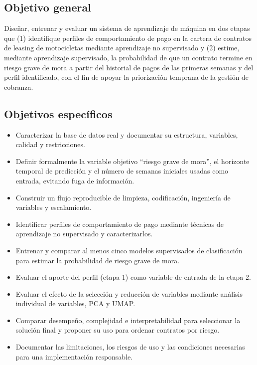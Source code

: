 \documentclass[journal]{IEEEtran}
\begin{document}
\subsection{Objetivo general}

Diseñar, entrenar y evaluar un sistema de aprendizaje de máquina en dos etapas que (1) identifique perfiles de comportamiento de pago en la cartera de contratos de leasing de motocicletas mediante aprendizaje no supervisado y (2) estime, mediante aprendizaje supervisado, la probabilidad de que un contrato termine en riesgo grave de mora a partir del historial de pagos de las primeras semanas y del perfil identificado, con el fin de apoyar la priorización temprana de la gestión de cobranza.

\subsection{Objetivos específicos}

\begin{itemize}
\item Caracterizar la base de datos real y documentar su estructura, variables, calidad y restricciones.
\item Definir formalmente la variable objetivo ``riesgo grave de mora'', el horizonte temporal de predicción y el número de semanas iniciales usadas como entrada, evitando fuga de información.
\item Construir un flujo reproducible de limpieza, codificación, ingeniería de variables y escalamiento.
\item Identificar perfiles de comportamiento de pago mediante técnicas de aprendizaje no supervisado y caracterizarlos.
\item Entrenar y comparar al menos cinco modelos supervisados de clasificación para estimar la probabilidad de riesgo grave de mora.
\item Evaluar el aporte del perfil (etapa 1) como variable de entrada de la etapa 2.
\item Evaluar el efecto de la selección y reducción de variables mediante análisis individual de variables, PCA y UMAP.
\item Comparar desempeño, complejidad e interpretabilidad para seleccionar la solución final y proponer su uso para ordenar contratos por riesgo.
\item Documentar las limitaciones, los riesgos de uso y las condiciones necesarias para una implementación responsable.
\end{itemize}
\end{document}
